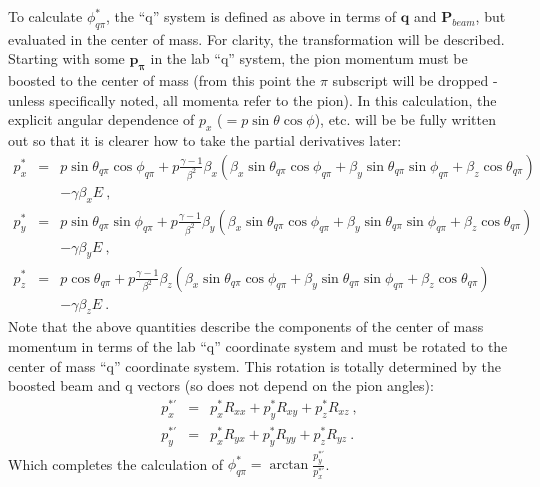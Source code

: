 To calculate $\phi^*_{q\pi}$, the ``q'' system is defined as above in terms of
$\mathbf{q}$ and $\mathbf{P}_{beam}$, but evaluated in the center of mass.  
For clarity, the transformation will be described.  Starting with some 
$\mathbf{p_{\pi}}$ in the lab ``q'' system, the pion momentum must be boosted 
to the center of mass (from this point the $\pi$ subscript will be dropped - 
unless specifically noted, all momenta refer to the pion).  In this 
calculation, the explicit angular dependence of 
$p_x$ ($=p\sin{\theta}\cos{\phi}$), etc. will be be fully written out so that 
it is clearer how to take the partial derivatives later:
\begin{eqnarray}
p_x^* & = & p\sin{\theta_{q\pi}}\cos{\phi_{q\pi}} + 
p\frac{\gamma-1}{\beta^2}\beta_x(\beta_x\sin{\theta_{q\pi}}\cos{\phi_{q\pi}}+
\beta_y\sin{\theta_{q\pi}}\sin{\phi_{q\pi}}+\beta_z\cos{\theta_{q\pi}}) 
\nonumber \\ 
& & - \gamma\beta_xE  \:, \\
p_y^* & = & p\sin{\theta_{q\pi}}\sin{\phi_{q\pi}} + 
p\frac{\gamma-1}{\beta^2}\beta_y(\beta_x\sin{\theta_{q\pi}}\cos{\phi_{q\pi}}+
\beta_y\sin{\theta_{q\pi}}\sin{\phi_{q\pi}}+\beta_z\cos{\theta_{q\pi}}) 
\nonumber \\
& & - \gamma\beta_yE \:, \\
p_z^* & = & p\cos{\theta_{q\pi}} + 
p\frac{\gamma-1}{\beta^2}\beta_z(\beta_x\sin{\theta_{q\pi}}\cos{\phi_{q\pi}}+
\beta_y\sin{\theta_{q\pi}}\sin{\phi_{q\pi}}+\beta_z\cos{\theta_{q\pi}}) 
\nonumber \\ 
& & - \gamma\beta_zE \:.
\end{eqnarray}
Note that the above quantities describe the components  of the center of mass 
momentum in terms of the lab ``q'' coordinate system and must be rotated to 
the center of mass ``q'' coordinate system. This rotation is totally determined
by the boosted beam and q vectors (so does not depend on the pion angles):
\begin{eqnarray}
p_x^{*'} & = & p_x^* R_{xx} + p_y^* R_{xy} + p_z^* R_{xz}  \:,\\
p_y^{*'} & = & p_x^* R_{yx} + p_y^* R_{yy} + p_z^* R_{yz} \:.
\end{eqnarray}
Which completes the calculation of 
$\phi_{q\pi}^* = \arctan{\frac{p_y^{*'}}{p_x^{*'}}}$.

